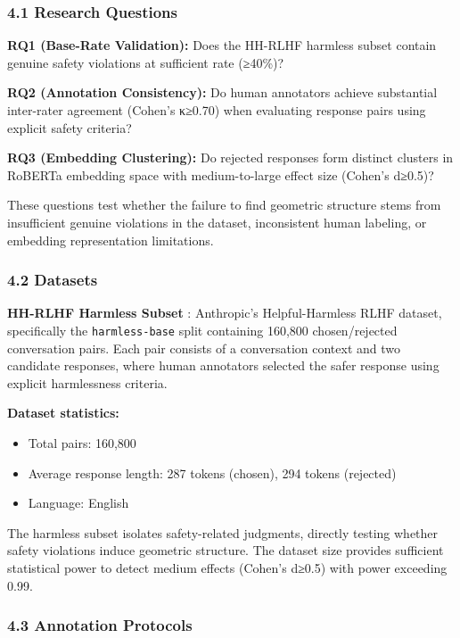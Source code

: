 
\subsubsection{4.1 Research Questions}

\textbf{RQ1 (Base-Rate Validation):} Does the HH-RLHF harmless subset contain genuine safety violations at sufficient rate (≥40\%)?

\textbf{RQ2 (Annotation Consistency):} Do human annotators achieve substantial inter-rater agreement (Cohen's κ≥0.70) when evaluating response pairs using explicit safety criteria?

\textbf{RQ3 (Embedding Clustering):} Do rejected responses form distinct clusters in RoBERTa embedding space with medium-to-large effect size (Cohen's d≥0.5)?

These questions test whether the failure to find geometric structure stems from insufficient genuine violations in the dataset, inconsistent human labeling, or embedding representation limitations.

\subsubsection{4.2 Datasets}

\textbf{HH-RLHF Harmless Subset} \citep{Baietal2022}: Anthropic's Helpful-Harmless RLHF dataset, specifically the \texttt{harmless-base} split containing 160,800 chosen/rejected conversation pairs. Each pair consists of a conversation context and two candidate responses, where human annotators selected the safer response using explicit harmlessness criteria.

\textbf{Dataset statistics:}
\begin{itemize}
\item Total pairs: 160,800
\item Average response length: 287 tokens (chosen), 294 tokens (rejected)
\item Language: English
\end{itemize}

The harmless subset isolates safety-related judgments, directly testing whether safety violations induce geometric structure. The dataset size provides sufficient statistical power to detect medium effects (Cohen's d≥0.5) with power exceeding 0.99.

\subsubsection{4.3 Annotation Protocols}

